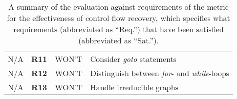 \begin{table}[htbp]
\begin{center}
\begin{tabular}{|l|l|l|l|}
			\hline
			N/A & \textbf{R11} & WON'T & Consider \textit{goto} statements \\
			N/A & \textbf{R12} & WON'T & Distinguish between \textit{for}- and \textit{while}-loops \\
			N/A & \textbf{R13} & WON'T & Handle irreducible graphs \\
			\hline
		\end{tabular}
	\end{center}
	\caption{A summary of the evaluation against requirements of the metric for the effectiveness of control flow recovery, which specifies what requirements (abbreviated as ``Req.'') that have been satisfied (abbreviated as ``Sat.'').}
	\label{tbl:eval_summary_of_metric}
\end{table}
